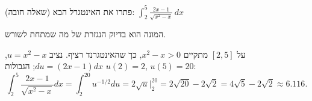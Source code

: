 
\begin{question}
(שאלה חובה)
פתרו את האינטגרל הבא:
$\displaystyle\int_2^5\frac{2x-1}{\sqrt{x^2-x}}\,dx$
\end{question}

\begin{hint}
המונה הוא בדיוק הנגזרת של מה שמתחת לשורש.
\end{hint}

\begin{solution}
על $[2,5]$ מתקיים $x^2-x>0$, כך שהאינטגרנד רציף. נציב $u=x^2-x$, $du=(2x-1)dx$; הגבולות $u(2)=2$, $u(5)=20$:
\[ \int_2^5\frac{2x-1}{\sqrt{x^2-x}}dx=\int_2^{20}u^{-1/2}du=2\sqrt u\Big|_2^{20}=2\sqrt{20}-2\sqrt2=\boxed{4\sqrt5-2\sqrt2}\approx 6.116. \]
\end{solution}
